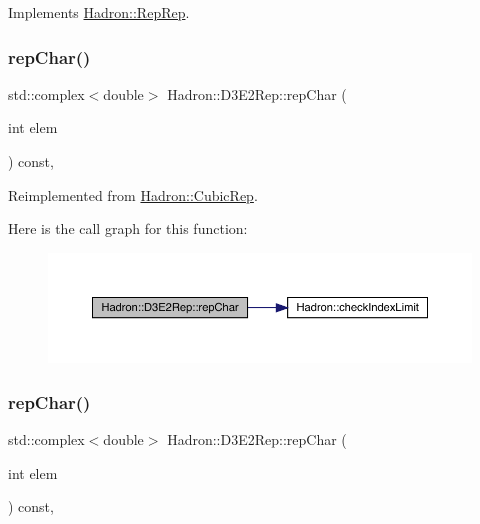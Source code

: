 Implements \mbox{\hyperlink{structHadron_1_1RepRep_ab3213025f6de249f7095892109575fde}{Hadron\+::\+Rep\+Rep}}.

\mbox{\label{structHadron_1_1D3E2Rep_a42a47ca21cfc9fe3d79daa1a5b697a2b}} 
\subsubsection{\texorpdfstring{repChar()}{repChar()}\hspace{0.1cm}{\footnotesize\ttfamily [1/3]}}
{\footnotesize\ttfamily std\+::complex$<$double$>$ Hadron\+::\+D3\+E2\+Rep\+::rep\+Char (\begin{DoxyParamCaption}\item[{int}]{elem }\end{DoxyParamCaption}) const\hspace{0.3cm}{\ttfamily [inline]}, {\ttfamily [virtual]}}



Reimplemented from \mbox{\hyperlink{structHadron_1_1CubicRep_af45227106e8e715e84b0af69cd3b36f8}{Hadron\+::\+Cubic\+Rep}}.

Here is the call graph for this function\+:
\nopagebreak
\begin{figure}[H]
\begin{center}
\leavevmode
\includegraphics[width=350pt]{db/de8/structHadron_1_1D3E2Rep_a42a47ca21cfc9fe3d79daa1a5b697a2b_cgraph}
\end{center}
\end{figure}
\mbox{\label{structHadron_1_1D3E2Rep_a42a47ca21cfc9fe3d79daa1a5b697a2b}} 
\subsubsection{\texorpdfstring{repChar()}{repChar()}\hspace{0.1cm}{\footnotesize\ttfamily [2/3]}}
{\footnotesize\ttfamily std\+::complex$<$double$>$ Hadron\+::\+D3\+E2\+Rep\+::rep\+Char (\begin{DoxyParamCaption}\item[{int}]{elem }\end{DoxyParamCaption}) const\hspace{0.3cm}{\ttfamily [inline]}, {\ttfamily [virtual]}}



